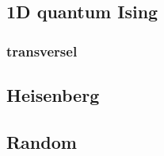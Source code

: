 \subsection{1D quantum Ising}
\subsubsection{transversel}

\subsection{Heisenberg}



\subsection{Random}
